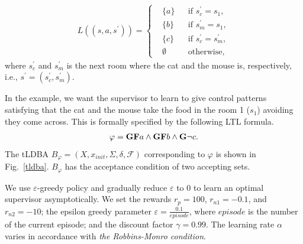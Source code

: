 \documentclass[letterpaper, 10 pt, conference]{ieeeconf}
\begin{document}
\begin{align}
   L((s, a, s^{\prime})) =
    \left\{
    \begin{aligned}
      & \{ a \} &  & \text{if }s_c^{\prime} = s_1, \nonumber \\
      & \{ b \} &  & \text{if }s_m^{\prime} = s_1, \nonumber \\
      & \{ c \} &  & \text{if }s_c^{\prime} = s_m^{\prime}, \nonumber \\
      & \emptyset &  & \text{otherwise},
    \end{aligned}
    \right.
\end{align}
where $s_c^{\prime}$ and $s_m^{\prime}$ is the next room where the cat and the mouse is, respectively, i.e., $s^{\prime} = (s_c^{\prime},s_m^{\prime})$.

In the example, we want the supervisor to learn to give control patterns satisfying that the cat and the mouse take the food in the room 1 ($s_1$) avoiding they come across. This is formally specified by the following LTL formula.
\begin{align*}
  \varphi = \text{{\bf GF}}a \wedge \text{{\bf GF}}b \wedge \text{{\bf G}}\neg c.
\end{align*}
The tLDBA $B_{\varphi} = (X, x_{init},\Sigma,\delta,\mathcal{F})$ corresponding to $\varphi$ is shown in Fig.\ \ref{tldba}. $B_{\varphi}$ has the acceptance condition of two accepting sets.

We use $\varepsilon$-greedy policy and gradually reduce $\varepsilon$ to 0 to learn an optimal supervisor asymptotically.
We set the rewards $r_p = 100$, $r_{n1} = -0.1$, and $r_{n2} = -10$; the epsilon greedy parameter $ \varepsilon = \frac{0.1}{episode}$, where $episode$ is the number of the current episode; and the discount factor $\gamma = 0.99$. The learning rate $\alpha$ varies in accordance with {\it the Robbins-Monro condition}.
\end{document}
